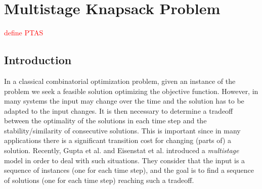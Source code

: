 \documentclass[a4paper]{book}
\newcommand{\alex}[2]{\textcolor{red}{#1}}
\begin{document}
\chapter{Multistage Knapsack Problem}
\alex{define PTAS}\\

\section{Introduction}
In a classical combinatorial optimization problem, given an instance of the problem we seek a feasible solution optimizing the objective function. However, in many systems the input may change over the time and the solution has to be adapted to the input changes. It is then necessary to determine a tradeoff between the optimality of the solutions in each time step and the stability/similarity of consecutive solutions. This is important since in many applications there is a significant transition cost for changing (parts of) a solution. 
Recently, Gupta et al.
\cite{Gupta} and Eisenstat et al. 
\cite{Eisenstat} introduced 
 a \emph{multistage} model in order to deal with such situations. They consider that the input is a sequence of instances (one for each time step), and the goal is to find a sequence of solutions (one for each time step) reaching such a tradeoff. 
\end{document}
